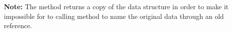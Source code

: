 \inputminted{csharp}{\context/answer/CustomerDatabase.cs}

\textbf{Note:} The  method returns a copy of the data structure in order to make it impossible for to calling method to name the original data through an old reference.
